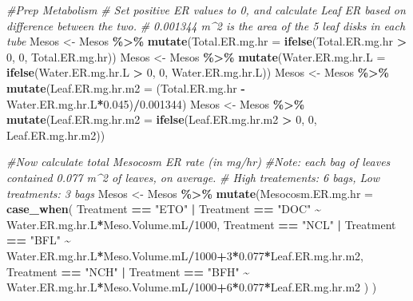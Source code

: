 \documentclass[
]{article}
\newenvironment{Shaded}{\begin{snugshade}}{\end{snugshade}}
\newcommand{\AttributeTok}[1]{\textcolor[rgb]{0.13,0.29,0.53}{#1}}
\newcommand{\CommentTok}[1]{\textcolor[rgb]{0.56,0.35,0.01}{\textit{#1}}}
\newcommand{\DecValTok}[1]{\textcolor[rgb]{0.00,0.00,0.81}{#1}}
\newcommand{\FloatTok}[1]{\textcolor[rgb]{0.00,0.00,0.81}{#1}}
\newcommand{\FunctionTok}[1]{\textcolor[rgb]{0.13,0.29,0.53}{\textbf{#1}}}
\newcommand{\NormalTok}[1]{#1}
\newcommand{\OtherTok}[1]{\textcolor[rgb]{0.56,0.35,0.01}{#1}}
\newcommand{\SpecialCharTok}[1]{\textcolor[rgb]{0.81,0.36,0.00}{\textbf{#1}}}
\newcommand{\StringTok}[1]{\textcolor[rgb]{0.31,0.60,0.02}{#1}}
\begin{document}
\begin{Shaded}
\begin{Highlighting}[]
\CommentTok{\#Prep Metabolism }
\CommentTok{\# Set positive ER values to 0, and calculate Leaf ER based on difference between the two.}
\CommentTok{\# 0.001344 m\^{}2 is the area of the 5 leaf disks in each tube}
\NormalTok{Mesos }\OtherTok{\textless{}{-}}\NormalTok{ Mesos }\SpecialCharTok{\%\textgreater{}\%} \FunctionTok{mutate}\NormalTok{(}\AttributeTok{Total.ER.mg.hr =} \FunctionTok{ifelse}\NormalTok{(Total.ER.mg.hr }\SpecialCharTok{\textgreater{}} \DecValTok{0}\NormalTok{, }\DecValTok{0}\NormalTok{, Total.ER.mg.hr))}
\NormalTok{Mesos }\OtherTok{\textless{}{-}}\NormalTok{ Mesos }\SpecialCharTok{\%\textgreater{}\%} \FunctionTok{mutate}\NormalTok{(}\AttributeTok{Water.ER.mg.hr.L =} \FunctionTok{ifelse}\NormalTok{(Water.ER.mg.hr.L }\SpecialCharTok{\textgreater{}} \DecValTok{0}\NormalTok{, }\DecValTok{0}\NormalTok{, Water.ER.mg.hr.L))}
\NormalTok{Mesos }\OtherTok{\textless{}{-}}\NormalTok{ Mesos }\SpecialCharTok{\%\textgreater{}\%} \FunctionTok{mutate}\NormalTok{(}\AttributeTok{Leaf.ER.mg.hr.m2 =}\NormalTok{ (Total.ER.mg.hr }\SpecialCharTok{{-}}\NormalTok{ Water.ER.mg.hr.L}\SpecialCharTok{*}\FloatTok{0.045}\NormalTok{)}\SpecialCharTok{/}\FloatTok{0.001344}\NormalTok{)}
\NormalTok{Mesos }\OtherTok{\textless{}{-}}\NormalTok{ Mesos }\SpecialCharTok{\%\textgreater{}\%} \FunctionTok{mutate}\NormalTok{(}\AttributeTok{Leaf.ER.mg.hr.m2 =} \FunctionTok{ifelse}\NormalTok{(Leaf.ER.mg.hr.m2 }\SpecialCharTok{\textgreater{}} \DecValTok{0}\NormalTok{, }\DecValTok{0}\NormalTok{, Leaf.ER.mg.hr.m2))}

\CommentTok{\#Now calculate total Mesocosm ER rate (in mg/hr)}
\CommentTok{\#Note: each bag of leaves contained 0.077 m\^{}2 of leaves, on average. }
\CommentTok{\# High treatements: 6 bags, Low treatments: 3 bags}
\NormalTok{Mesos }\OtherTok{\textless{}{-}}\NormalTok{ Mesos }\SpecialCharTok{\%\textgreater{}\%} \FunctionTok{mutate}\NormalTok{(}\AttributeTok{Mesocosm.ER.mg.hr =} \FunctionTok{case\_when}\NormalTok{(}
\NormalTok{  Treatment }\SpecialCharTok{==} \StringTok{"ETO"} \SpecialCharTok{|}\NormalTok{ Treatment }\SpecialCharTok{==} \StringTok{"DOC"} \SpecialCharTok{\textasciitilde{}}\NormalTok{ Water.ER.mg.hr.L}\SpecialCharTok{*}\NormalTok{Meso.Volume.mL}\SpecialCharTok{/}\DecValTok{1000}\NormalTok{,}
\NormalTok{  Treatment }\SpecialCharTok{==} \StringTok{"NCL"} \SpecialCharTok{|}\NormalTok{ Treatment }\SpecialCharTok{==} \StringTok{"BFL"} \SpecialCharTok{\textasciitilde{}}\NormalTok{ Water.ER.mg.hr.L}\SpecialCharTok{*}\NormalTok{Meso.Volume.mL}\SpecialCharTok{/}\DecValTok{1000}\SpecialCharTok{+}\DecValTok{3}\SpecialCharTok{*}\FloatTok{0.077}\SpecialCharTok{*}\NormalTok{Leaf.ER.mg.hr.m2,}
\NormalTok{  Treatment }\SpecialCharTok{==} \StringTok{"NCH"} \SpecialCharTok{|}\NormalTok{ Treatment }\SpecialCharTok{==} \StringTok{"BFH"} \SpecialCharTok{\textasciitilde{}}\NormalTok{ Water.ER.mg.hr.L}\SpecialCharTok{*}\NormalTok{Meso.Volume.mL}\SpecialCharTok{/}\DecValTok{1000}\SpecialCharTok{+}\DecValTok{6}\SpecialCharTok{*}\FloatTok{0.077}\SpecialCharTok{*}\NormalTok{Leaf.ER.mg.hr.m2}
\NormalTok{  )}
\NormalTok{)}


\end{Highlighting}
\end{Shaded}
\end{document}

